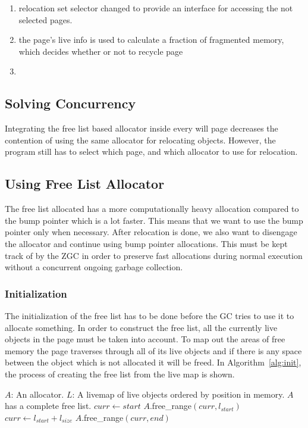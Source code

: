 \begin{enumerate}
    \item relocation set selector changed to provide an interface for accessing the not selected pages.
    \item the page's live info is used to calculate a fraction of fragmented memory, which decides whether or not to recycle page
    \item 
\end{enumerate}

\subsection{Solving Concurrency}
Integrating the free list based allocator inside every will page decreases the contention of using the same allocator for relocating objects. However, the program still has to select which page, and which allocator to use for relocation.

\subsection{Using Free List Allocator}
The free list allocated has a more computationally heavy allocation compared to the bump pointer which is a lot faster. This means that we want to use the bump pointer only when necessary. After relocation is done, we also want to disengage the allocator and continue using bump pointer allocations. This must be kept track of by the ZGC in order to preserve fast allocations during normal execution without a concurrent ongoing garbage collection.
\subsubsection{Initialization}
The initialization of the free list has to be done before the GC tries to use it to allocate something. In order to construct the free list, all the currently live objects in the page must be taken into account. To map out the areas of free memory the page traverses through all of its live objects and if there is any space between the object which is not allocated it will be freed. In Algorithm~\ref{alg:init}, the process of creating the free list from the live map is shown.

\begin{algorithm}{}
    \caption{$(A,L)$}
    \label{alg:init}
    \begin{algorithmic}[1]
        \Require 
        \Statex $A$: An allocator.
        \Statex $L$: A livemap of live objects ordered by position in memory. 
        \Ensure 
        \Statex $A$ has a complete free list.
        \State $curr\gets start$ 
        \State $A$.free\_range$(curr, l_{start})$ 
        \EndIf
        \State $curr\gets l_{start} + l_{size}$ 
        \EndFor
        \State $A$.free\_range$(curr,end)$ 
    \end{algorithmic}
\end{algorithm}

